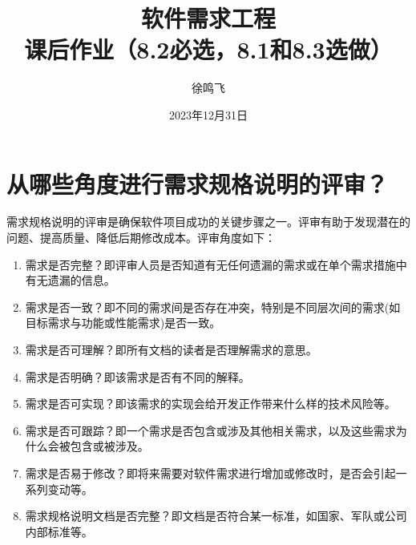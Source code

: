 \documentclass[11pt, a4paper, oneside]{ctexbook}
\title{{\Huge{\textbf{软件需求工程}}}\\课后作业（8.2必选，8.1和8.3选做）}
\author{徐鸣飞}
\date{2023年12月31日}
\begin{document}
\maketitle

\newpage
{}
\setcounter{page}{1}
\tableofcontents
\newpage
\setcounter{page}{1}

\chapter{从哪些角度进行需求规格说明的评审？}
需求规格说明的评审是确保软件项目成功的关键步骤之一。评审有助于发现潜在的问题、提高质量、降低后期修改成本。评审角度如下：
\begin{enumerate}
    \item 需求是否完整？即评审人员是否知道有无任何遗漏的需求或在单个需求措施中有无遗漏的信息。
    \item 需求是否一致？即不同的需求间是否存在冲突，特别是不同层次间的需求(如目标需求与功能或性能需求)是否一致。
    \item 需求是否可理解？即所有文档的读者是否理解需求的意思。
    \item 需求是否明确？即该需求是否有不同的解释。
    \item 需求是否可实现？即该需求的实现会给开发正作带来什么样的技术风险等。
    \item 需求是否可跟踪？即一个需求是否包含或涉及其他相关需求，以及这些需求为什么会被包含或被涉及。
    \item 需求是否易于修改？即将来需要对软件需求进行增加或修改时，是否会引起一系列变动等。
    \item 需求规格说明文档是否完整？即文档是否符合某一标准，如国家、军队或公司内部标准等。
\end{enumerate}
\end{document}
